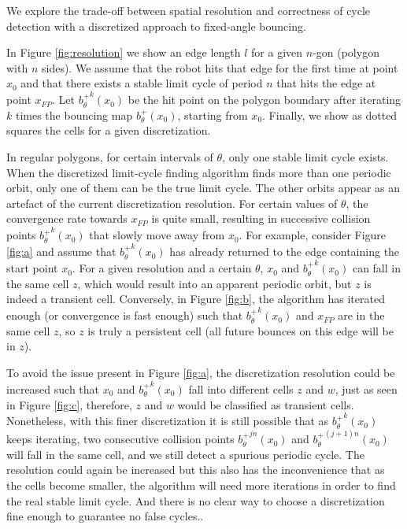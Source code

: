 \documentclass[12pt,a4paper]{article}
\begin{document}
We explore the trade-off between spatial resolution and correctness of cycle
detection with a discretized approach to fixed-angle bouncing.

In Figure \ref{fig:resolution} we show an edge length $l$ for a given $n$-gon
(polygon with $n$ sides). We assume that the robot hits that edge for the first
time at point $x_0$ and that there exists a stable limit cycle of period $n$
that hits the edge at point $x_{FP}$. Let ${b^+_{\theta}}^{k}(x_0)$ be the hit
point on the polygon boundary after iterating $k$ times the bouncing map
${b^+_{\theta}}(x_0)$, starting from $x_0$. Finally, we show as dotted squares
the cells for a given discretization.

In regular polygons, for certain intervals of $\theta$, only one stable limit cycle
exists. When the discretized limit-cycle finding algorithm finds more than one periodic orbit, only one
of them can be the true limit cycle. The other orbits appear as an artefact of
the current discretization resolution. For certain values of $\theta$, the
convergence rate towards $x_{FP}$ is quite small, resulting in successive collision points
${b^+_{\theta}}^{k}(x_0)$ that slowly move away from $x_0$. For example,
consider Figure \ref{fig:a} and assume that ${b^+_{\theta}}^{k}(x_0)$ has
already returned to the edge containing the start point $x_0$. For a given resolution and a certain
$\theta$, $x_0$ and ${b^+_{\theta}}^{k}(x_0)$ can fall in the same cell $z$,
which would result into an apparent periodic orbit, but $z$ is indeed a
transient cell. Conversely, in Figure \ref{fig:b}, the algorithm has iterated
enough (or convergence is fast enough) such that ${b^+_{\theta}}^{k}(x_0)$ and $x_{FP}$ are in the same cell
$z$, so $z$ is truly a persistent cell (all future bounces on this edge will be
in $z$).

To avoid the issue present in Figure \ref{fig:a}, the discretization resolution
could be increased such that $x_0$ and ${b^+_{\theta}}^{k}(x_0)$ fall into
different cells $z$ and $w$, just as seen in Figure \ref{fig:c}, therefore, $z$
and $w$ would be classified as transient cells. Nonetheless, with this finer
discretization it is still possible that as ${b^+_{\theta}}^{k}(x_0)$ keeps
iterating, two consecutive collision points ${b^+_{\theta}}^{jn}(x_0)$ and
${b^+_{\theta}}^{(j+1)n}(x_0)$ will fall in
the same cell, and we still detect a spurious periodic cycle. The resolution could
again be increased but this also has the inconvenience that as the cells become
smaller, the algorithm will need more iterations in order to find the real
stable limit cycle. And there is no clear way to choose a discretization fine
enough to guarantee no false cycles..
\end{document}
